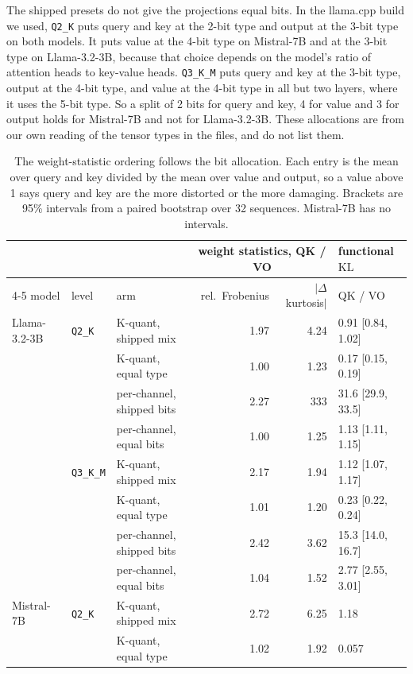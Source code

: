 \documentclass[journal]{IEEEtran}
\newcommand{\KL}{\mathrm{KL}}
\begin{document}
The shipped presets do not give the projections equal bits. In the llama.cpp build we used,
\texttt{Q2\_K} puts query and key at the 2-bit type and output at the 3-bit type on both models.
It puts value at the 4-bit type on Mistral-7B and at the 3-bit type on Llama-3.2-3B, because
that choice depends on the model's ratio of attention heads to key-value heads. \texttt{Q3\_K\_M}
puts query and key at the 3-bit type, output at the 4-bit type, and value at the 4-bit type in
all but two layers, where it uses the 5-bit type. So a split of 2 bits for query and key, 4 for value and 3 for output holds for Mistral-7B
and not for Llama-3.2-3B. These allocations are from our own reading of the tensor types in the
files, and \citet{rababah2026illusion} do not list them.

\begin{table}[t]
\centering
\caption{The weight-statistic ordering follows the bit allocation. Each entry is the
mean over query and key divided by the mean over value and output, so a value above 1 says query
and key are the more distorted or the more damaging. Brackets are 95\% intervals from a paired
bootstrap over 32 sequences. Mistral-7B has no intervals.}
\label{tab:factorial}
\small
\begin{tabular}{lllrrl}
\toprule
 & & & \multicolumn{2}{c}{weight statistics, QK / VO} & functional $\KL$ \\
\cmidrule(lr){4-5}
model & level & arm & rel.\ Frobenius & $|\Delta$kurtosis$|$ & QK / VO \\
\midrule
Llama-3.2-3B & \texttt{Q2\_K} & K-quant, shipped mix & 1.97 & 4.24 & 0.91 [0.84, 1.02] \\
 & & K-quant, equal type & 1.00 & 1.23 & 0.17 [0.15, 0.19] \\
 & & per-channel, shipped bits & 2.27 & 333 & 31.6 [29.9, 33.5] \\
 & & per-channel, equal bits & 1.00 & 1.25 & 1.13 [1.11, 1.15] \\
 & \texttt{Q3\_K\_M} & K-quant, shipped mix & 2.17 & 1.94 & 1.12 [1.07, 1.17] \\
 & & K-quant, equal type & 1.01 & 1.20 & 0.23 [0.22, 0.24] \\
 & & per-channel, shipped bits & 2.42 & 3.62 & 15.3 [14.0, 16.7] \\
 & & per-channel, equal bits & 1.04 & 1.52 & 2.77 [2.55, 3.01] \\
\midrule
Mistral-7B & \texttt{Q2\_K} & K-quant, shipped mix & 2.72 & 6.25 & 1.18 \\
 & & K-quant, equal type & 1.02 & 1.92 & 0.057 \\

\end{tabular}
\end{table}
\end{document}
